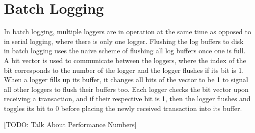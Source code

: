 \section{Batch Logging}

In batch logging, multiple loggers are in operation at the same time as opposed to in serial logging, where there is only one logger. Flushing the log buffers to disk in batch logging uses the naive scheme of flushing all log buffers once one is full. A bit vector is used to communicate between the loggers, where the index of the bit corresponds to the number of the logger and the logger flushes if its bit is 1. When a logger fills up its buffer, it changes all bits of the vector to be 1 to signal all other loggers to flush their buffers too. Each logger checks the bit vector upon receiving a transaction, and if their respective bit is 1, then the logger flushes  and toggles its bit to 0 before placing the newly received transaction into its buffer. 

[TODO: Talk About Performance Numbers]

